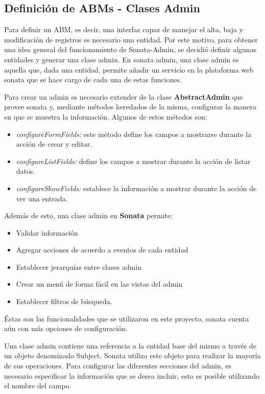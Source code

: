 
\subsection{Definición de ABMs - Clases Admin}%
\label{sub:definición_de_abms_clases_admin}

Para definir un ABM, es decir, una interfaz capaz de manejar el alta, baja y modificación de registros es necesario una entidad. Por este motivo, para obtener
una idea general del funcionamiento de Sonata-Admin, se decidió definir algunas entidades y generar una clase admin\@.
En sonata admin, una clase admin es aquella que, dada una entidad, permite añadir un servicio en la plataforma web sonata que se hace cargo de cada una de estas funciones.

Para crear un admin es necesario extender de la clase \textbf{AbstractAdmin} que provee sonata y, mediante métodos heredados de la misma, configurar la manera en
que se muestra la información\@.
Algunos de estos métodos son:

\begin{itemize}
    \item \textit{configureFormFields:} este método define los campos a mostrarse durante la acción de crear y editar.
    \item \textit{configureListFields:} define los campos a mostrar durante la acción de listar datos.
    \item \textit{configureShowFields:} establece la información a mostrar durante la acción de ver una entrada.
\end{itemize}

\noindent
Además de esto, una clase admin en \textbf{Sonata} permite:
\begin{itemize}
    \item Validar información
    \item Agregar acciones de acuerdo a eventos de cada entidad
    \item Establecer jerarquías entre clases admin
    \item Crear un menú de forma fácil en las vistas del admin
    \item Establecer filtros de búsqueda.
\end{itemize}

Éstas son las funcionalidades que se utilizaron en este proyecto, sonata cuenta aún con más opciones de configuración.

Una clase admin contiene una referencia a la entidad base del mismo a través de un objeto denominado Subject. Sonata utiliza este objeto para realizar
la mayoría de sus operaciones.
Para configurar las diferentes secciones del admin, es necesario especificar la información que se desea incluir, esto es posible utilizando el nombre del campo.

